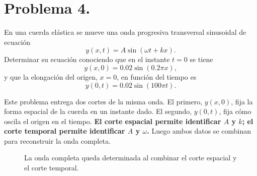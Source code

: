 \documentclass[11pt]{article}
\begin{document}
\clearpage

\section*{Problema 4.}
En una cuerda el\'astica se mueve una onda progresiva transversal sinusoidal de ecuaci\'on
\begin{equation*}
    y(x,t)=A\sin(\omega t+kx).
\end{equation*}
Determinar su ecuaci\'on conociendo que en el instante $t=0$ se tiene
\begin{equation*}
    y(x,0)=0.02\sin(0.2\pi x),
\end{equation*}
y que la elongaci\'on del origen, $x=0$, en funci\'on del tiempo es
\begin{equation*}
    y(0,t)=0.02\sin(100\pi t).
\end{equation*}


Este problema entrega dos cortes de la misma onda. El primero, $y(x,0)$, fija la forma espacial de la cuerda en un instante dado. El segundo, $y(0,t)$, fija c\'omo oscila el origen en el tiempo.
\textbf{El corte espacial permite identificar $A$ y $k$; el corte temporal permite identificar $A$ y $\omega$.} Luego ambos datos se combinan para reconstruir la onda completa.


\begin{figure}[H]
\centering
{}
\caption{La onda completa queda determinada al combinar el corte espacial y el corte temporal.}
\label{fig:p4_cortes}
\end{figure}
\end{document}
